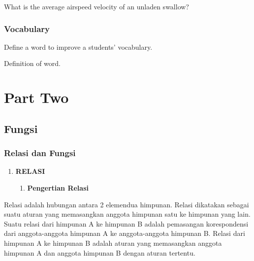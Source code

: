 \documentclass[11pt,fleqn]{book} %
\begin{document}
\begin{problem}
What is the average airspeed velocity of an unladen swallow?
\end{problem}


\section{Vocabulary}

Define a word to improve a students' vocabulary.

\begin{vocabulary}[Word]
Definition of word.
\end{vocabulary}


\part{Part Two}



\chapter{Fungsi}

\section{Relasi dan Fungsi}

\begin{enumerate}
\item \textbf{ RELASI}

\begin{enumerate}
\item \textbf{ Pengertian Relasi}
\end{enumerate}
\end{enumerate}

\noindent 

 Relasi adalah hubungan antara 2 elemendua himpunan. Relasi dikatakan sebagai suatu aturan yang memasangkan anggota himpunan satu ke himpunan yang lain. Suatu relasi dari himpunan A ke himpunan B adalah pemasangan korespondensi dari anggota-anggota himpunan A ke anggota-anggota himpunan B. Relasi dari himpunan A ke himpunan B adalah aturan yang memasangkan anggota himpunan A dan anggota himpunan B dengan aturan tertentu.
\end{document}
